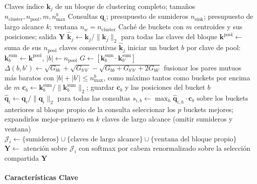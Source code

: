 \begin{algorithm}[H]
\caption{N-LSA: clustering Ward de un bloque y búsqueda semántica plana}
\begin{algorithmic}[1]
\Require Claves índice $\mathbf{k}_j$ de un bloque de clustering completo; tamaños $n_{\text{cluster}}, n_{\text{pool}}, m, n_{\max}^b$
\Require Consultas $\mathbf{q}_i$; presupuesto de sumideros $n_{\text{sink}}$; presupuesto de largo alcance $k$; ventana $n_w = n_{\text{cluster}}$
\Ensure Caché de buckets con $m$ centroides y sus posiciones; salida $\mathbf{Y}$
\State $\hat{\mathbf{k}}_j \gets \mathbf{k}_j / \lVert \mathbf{k}_j \rVert_2$ para todas las claves del bloque
    \State $\mathbf{k}^{\text{pool}} \gets$ suma de sus $n_{\text{pool}}$ claves consecutivas $\hat{\mathbf{k}}_j$
\EndFor
\State iniciar un bucket $b$ por clave de pool: $\mathbf{k}^{\text{sum}}_b \gets \mathbf{k}^{\text{pool}}$, $|b| \gets n_{\text{pool}}$
    \State $G \gets [\mathbf{k}^{\text{sum}}_b \cdot \mathbf{k}^{\text{sum}}_{b'}]$ 
    \State $\Delta(b,b') \gets \sqrt{G_{bb}} + \sqrt{G_{b'b'}} - \sqrt{G_{bb} + G_{b'b'} + 2G_{bb'}}$
    \State fusionar los pares mutuos más baratos con $|b| + |b'| \le n_{\max}^b$, como máximo tantos como buckets por encima de $m$
\EndWhile
\State $\mathbf{c}_b \gets \mathbf{k}^{\text{sum}}_b / \lVert \mathbf{k}^{\text{sum}}_b \rVert_2$; guardar $\mathbf{c}_b$ y las posiciones del bucket $b$
\State $\hat{\mathbf{q}}_i \gets \mathbf{q}_i / \lVert \mathbf{q}_i \rVert_2$ para todas las consultas
\State $s_{i,b} \gets \max_h \hat{\mathbf{q}}_{i,h} \cdot \mathbf{c}_b$ sobre los buckets anteriores al bloque propio de la consulta
\State seleccionar los $p$ buckets mejores; expandirlos mejor-primero en $k$ claves de largo alcance (omitir sumideros y ventana)
\State $\mathcal{J}_i \gets \{\text{sumideros}\} \cup \{\text{claves de largo alcance}\} \cup \{\text{ventana del bloque propio}\}$
\State $\mathbf{Y} \gets$ atención sobre $\mathcal{J}_i$ con softmax por cabeza renormalizado sobre la selección compartida
\Return $\mathbf{Y}$
\end{algorithmic}
\end{algorithm}

\paragraph{Características Clave}

